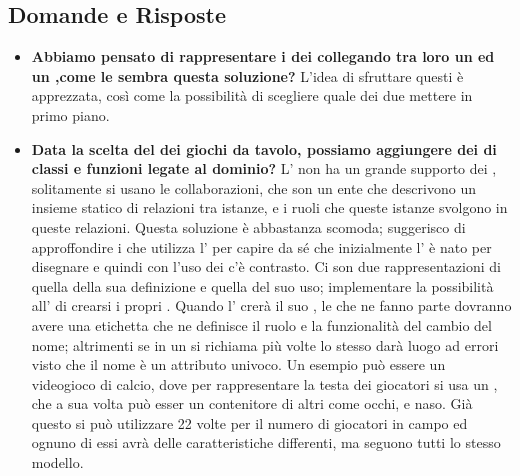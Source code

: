 	  \subsection{Domande e Risposte}
	   \begin{itemize}
	   
	   	   	\item 
	   		\textbf{Abbiamo pensato di rappresentare i  dei  collegando tra loro un  ed un ,come le sembra questa soluzione?}
	    	\justifying     		
L'idea di sfruttare questi  è apprezzata, così come la possibilità di scegliere quale dei due  mettere in primo piano.\\
	   	\item 
	   		\textbf{Data la scelta del  dei giochi da tavolo, possiamo aggiungere dei  di classi e funzioni legate al dominio?}
	    	\justifying     		
L' non ha un grande supporto dei , solitamente si usano le collaborazioni, che son un ente che descrivono un insieme statico di relazioni tra istanze, e i ruoli che queste istanze svolgono in queste relazioni. Questa soluzione è abbastanza scomoda; suggerisco di approffondire i  che utilizza l' per capire da sé che inizialmente l' è nato per disegnare  e quindi con l'uso dei  c'è contrasto. 
Ci son due rappresentazioni di  quella della sua definizione e quella del suo uso; implementare la possibilità all' di crearsi i propri . Quando l' crerà il suo , le  che ne fanno parte dovranno avere una etichetta che ne definisce il ruolo e la funzionalità del cambio del nome; altrimenti se in un  si richiama più volte lo stesso  darà luogo ad errori visto che il nome è un attributo univoco. Un esempio può essere un videogioco di calcio, dove per rappresentare la testa dei giocatori si usa un , che a sua volta può esser un contenitore di altri  come occhi, e naso. Già questo  si può utilizzare 22 volte per il numero di giocatori in campo ed ognuno di essi avrà delle caratteristiche differenti, ma seguono tutti lo stesso modello.

\end{itemize}
